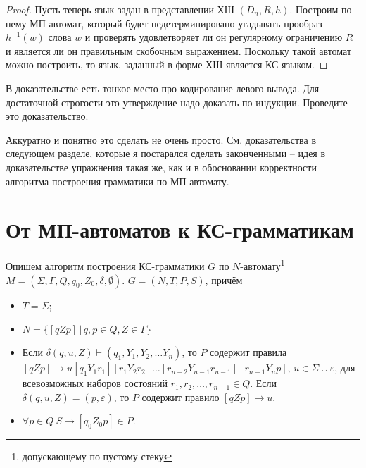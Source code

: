 \documentclass[12pt]{article}
\theoremstyle{definiton}
\theoremstyle{definition}
\theoremstyle{definition}
\let\es\emptyset
\let\eps\varepsilon
\newcounter{problem}
\newcounter{uproblem}
\newcounter{subproblem}
\def\upr{\medskip\noindent\stepcounter{uproblem}{\bf Упражнение \theuproblem .  }\setcounter{subproblem}{0} }
\begin{document}
\begin{proof}
	Пусть теперь язык задан в представлении ХШ $(D_n,R,h)$. Построим по нему МП-автомат, который будет недетерминировано угадывать прообраз $h^{-1}(w)$ слова $w$ и проверять удовлетворяет ли он регулярному ограничению $R$ и является ли он правильным скобочным выражением. Поскольку такой автомат можно построить, то язык, заданный в форме ХШ является КС-языком.
	
\end{proof}

\upr В доказательстве есть тонкое место про кодирование левого вывода. Для достаточной строгости это утверждение надо доказать по индукции. Проведите это доказательство.

Аккуратно и понятно это сделать не очень просто. См. доказательства в следующем разделе, которые я постарался сделать законченными -- идея в доказательстве упражнения такая же, как и в обосновании корректности алгоритма построения грамматики по МП-автомату.

\section{От МП-автоматов к КС-грамматикам}

Опишем алгоритм построения КС-грамматики $G$ по $N$-автомату\footnote{допускающему по пустому стеку} $M = (\Sigma, \Gamma, Q, q_0, Z_0, \delta, \es)$. $G = (N,T,P,S)$, причём

\begin{itemize}
	\item $T = \Sigma$;
	\item $N = \{ [qZp]\,|\, q,p \in Q, Z \in \Gamma \}$
	\item Если $\delta(q,u,Z) \vdash (q_1,Y_1,Y_2,\ldots Y_n)$, то $P$ содержит правила $[qZp] \to u[q_1Y_1r_1][r_1Y_2r_2]\ldots[r_{n-2}Y_{n-1}r_{n-1}][r_{n-1}Y_np]$, $u \in \Sigma\cup\eps$, для всевозможных наборов состояний $r_1,r_2,\ldots,r_{n-1}\in Q$. Если $\delta(q,u,Z) = (p,\eps)$, то $P$ содержит правило $[qZp] \to u $.
	\item  $\forall p \in Q\ S \to [q_0Z_0p] \in P$. 
\end{itemize}
\end{document}
